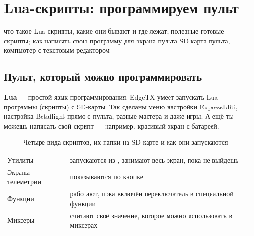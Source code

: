 \chapter{Lua-скрипты: программируем пульт}
\label{ch:lua}
\chapterintro
  {что такое Lua-скрипты, какие они бывают и где лежат; полезные готовые скрипты;
   как написать свою программу для экрана пульта}
  {SD-карта пульта, компьютер с текстовым редактором}

\section{Пульт, который можно программировать}

\begin{simple}
\textbf{Lua} --- простой язык программирования. EdgeTX умеет запускать Lua-программы
(скрипты) с SD-карты. Так сделаны меню настройки ExpressLRS, настройка Betaflight прямо с пульта,
разные мастера и даже игры. А ещё ты можешь написать свой скрипт --- например, красивый экран
с батареей.
\end{simple}

\begin{figure}[H]
\centering
{}
\caption{Четыре вида скриптов, их папки на SD-карте и как они запускаются}
\end{figure}

\begin{center}\small
\renewcommand{\arraystretch}{1.2}
\begin{tabularx}{\linewidth}{@{}L{26mm}Y@{}}
\toprule
Утилиты & запускаются из , занимают весь экран, пока не выйдешь \\
Экраны телеметрии & показываются по кнопке  \\
Функции & работают, пока включён переключатель в специальной функции \\
Миксеры & считают своё значение, которое можно использовать в миксерах \\
\bottomrule
\end{tabularx}
\end{center}

